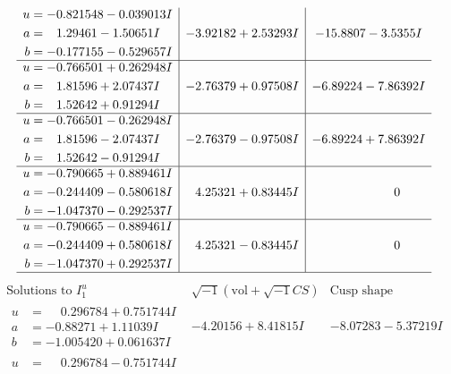 \documentclass[1p]{elsarticle_modified}
\theoremstyle{definition}
\newcommand{\I}{\sqrt{-1}}
\begin{document}
$$\begin{array}{c|c|c}
\begin{aligned}
u &= -0.821548 - 0.039013 I \\
a &= \phantom{-}1.29461 - 1.50651 I \\
b &= -0.177155 - 0.529657 I\end{aligned}
 & -3.92182 + 2.53293 I & -15.8807 - 3.5355 I \\ \hline\begin{aligned}
u &= -0.766501 + 0.262948 I \\
a &= \phantom{-}1.81596 + 2.07437 I \\
b &= \phantom{-}1.52642 + 0.91294 I\end{aligned}
 & -2.76379 + 0.97508 I & -6.89224 - 7.86392 I \\ \hline\begin{aligned}
u &= -0.766501 - 0.262948 I \\
a &= \phantom{-}1.81596 - 2.07437 I \\
b &= \phantom{-}1.52642 - 0.91294 I\end{aligned}
 & -2.76379 - 0.97508 I & -6.89224 + 7.86392 I \\ \hline\begin{aligned}
u &= -0.790665 + 0.889461 I \\
a &= -0.244409 - 0.580618 I \\
b &= -1.047370 - 0.292537 I\end{aligned}
 & \phantom{-}4.25321 + 0.83445 I & \phantom{-0.000000 } 0 \\ \hline\begin{aligned}
u &= -0.790665 - 0.889461 I \\
a &= -0.244409 + 0.580618 I \\
b &= -1.047370 + 0.292537 I\end{aligned}
 & \phantom{-}4.25321 - 0.83445 I & \phantom{-0.000000 } 0\\
 \hline 
 \end{array}$$\newpage$$\begin{array}{c|c|c}  
\text{Solutions to }I^u_{1}& \I (\text{vol} + \sqrt{-1}CS) & \text{Cusp shape}\\
 \hline 
\begin{aligned}
u &= \phantom{-}0.296784 + 0.751744 I \\
a &= -0.88271 + 1.11039 I \\
b &= -1.005420 + 0.061637 I\end{aligned}
 & -4.20156 + 8.41815 I & -8.07283 - 5.37219 I \\ \hline\begin{aligned}
u &= \phantom{-}0.296784 - 0.751744 I \\

\end{aligned}
\end{array}$$
\end{document}
